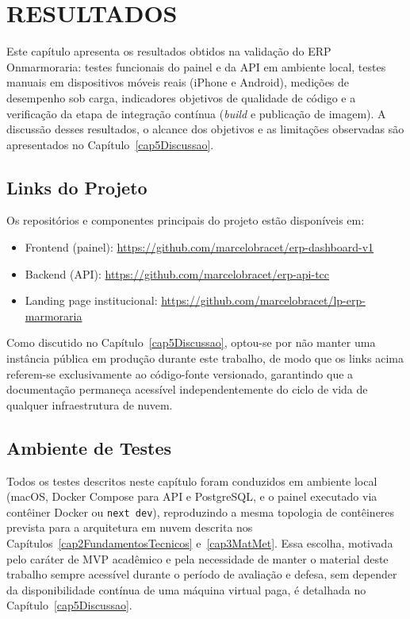 \chapter{RESULTADOS}\label{cap4Resultados}

Este capítulo apresenta os resultados obtidos na validação do ERP Onmarmoraria: testes funcionais do painel e da API em ambiente local, testes manuais em dispositivos móveis reais (iPhone e Android), medições de desempenho sob carga, indicadores objetivos de qualidade de código e a verificação da etapa de integração contínua (\textit{build} e publicação de imagem). A discussão desses resultados, o alcance dos objetivos e as limitações observadas são apresentados no Capítulo~\ref{cap5Discussao}.

\section{Links do Projeto}

Os repositórios e componentes principais do projeto estão disponíveis em:

\begin{itemize}
  \item Frontend (painel): \url{https://github.com/marcelobracet/erp-dashboard-v1}
  \item Backend (API): \url{https://github.com/marcelobracet/erp-api-tcc}
  \item Landing page institucional: \url{https://github.com/marcelobracet/lp-erp-marmoraria}
\end{itemize}

Como discutido no Capítulo~\ref{cap5Discussao}, optou-se por não manter uma instância pública em produção durante este trabalho, de modo que os links acima referem-se exclusivamente ao código-fonte versionado, garantindo que a documentação permaneça acessível independentemente do ciclo de vida de qualquer infraestrutura de nuvem.

\section{Ambiente de Testes}

Todos os testes descritos neste capítulo foram conduzidos em ambiente local (macOS, Docker Compose para API e PostgreSQL, e o painel executado via contêiner Docker ou \texttt{next dev}), reproduzindo a mesma topologia de contêineres prevista para a arquitetura em nuvem descrita nos Capítulos~\ref{cap2FundamentosTecnicos} e~\ref{cap3MatMet}. Essa escolha, motivada pelo caráter de MVP acadêmico e pela necessidade de manter o material deste trabalho sempre acessível durante o período de avaliação e defesa, sem depender da disponibilidade contínua de uma máquina virtual paga, é detalhada no Capítulo~\ref{cap5Discussao}.

